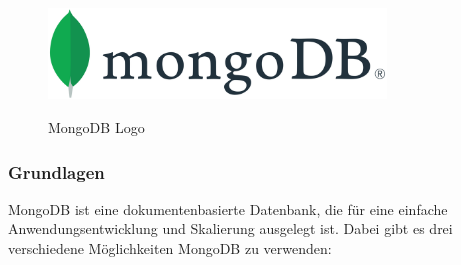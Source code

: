 \begin{figure}[h!]
    \centering
    \includegraphics[width=0.8\textwidth]{pics/mongodb.png}
    \caption{MongoDB Logo}
    \cite{database_mongodb_logo}
    \label{fig:enter-label}
\end{figure}

\subsubsection{Grundlagen}
MongoDB ist eine dokumentenbasierte Datenbank, die für eine einfache Anwendungsentwicklung und Skalierung ausgelegt ist. Dabei gibt es drei verschiedene Möglichkeiten MongoDB zu verwenden: 
